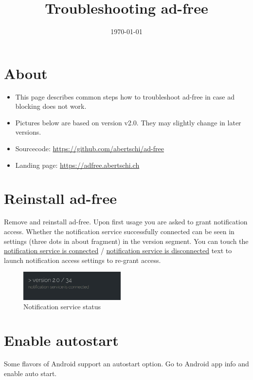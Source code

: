 \documentclass[11pt]{article}
\date{\today}
\title{Troubleshooting ad-free}
\begin{document}
\maketitle
\tableofcontents


\section{About}
\label{sec:orgddb93db}
\begin{itemize}
\item This page describes common steps how to troubleshoot ad-free in case
ad blocking does not work.

\item Pictures below are based on version v2.0. They may slightly change in later versions.

\item Sourcecode: \url{https://github.com/abertschi/ad-free}

\item Landing page: \url{https://adfree.abertschi.ch}
\end{itemize}

\section{Reinstall ad-free}
\label{sec:orgbc3ddb2}
Remove and reinstall ad-free. Upon first usage you are asked to grant
notification access. Whether the notification service successfully
connected can be seen in settings (three dots in about fragment) in
the version segment. You can touch the \uline{notification service is
connected} / \uline{notification service is disconnected} text to launch
notification access settings to re-grant access.

\begin{figure}[htbp]
\centering
\includegraphics[width=200px]{./res/img-not-service-conn.jpg}
\caption{Notification service status}
\end{figure}

\section{Enable autostart}
\label{sec:org75eb9f9}
Some flavors of Android support an autostart option. Go to Android app info
and enable auto start.
\end{document}
